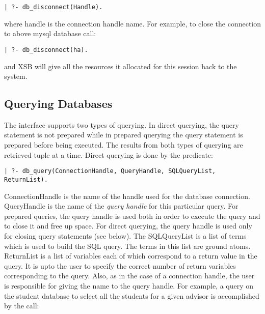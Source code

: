 \begin{verbatim}
| ?- db_disconnect(Handle).
\end{verbatim}

\noindent
where handle is the connection handle name. For example, 
to close the connection to above mysql database call:

\begin{verbatim}
| ?- db_disconnect(ha).
\end{verbatim}

and XSB will give all the resources it allocated for this session back
to the system.


\subsection{Querying Databases}

The interface supports two types of querying. In direct querying, the
query statement is not prepared while in prepared querying the query
statement is prepared before being executed. The results from
both types of querying are retrieved tuple at a time.
Direct querying is done by the predicate:

\begin{verbatim}
| ?- db_query(ConnectionHandle, QueryHandle, SQLQueryList, ReturnList).
\end{verbatim}

ConnectionHandle is the name of the handle used for the database connection.
QueryHandle is the name of the \emph{query handle} for this particular query. 
For prepared queries, the query handle is used both in order to execute the
query and to close it and free up space. For direct querying,
the query handle is used only for closing query statements (see below).
The SQLQueryList is a list of terms which is used to build the SQL query.
The terms in this list are ground atoms. ReturnList is a list of 
variables each of which correspond to a return value in the query.
It is upto the user to specify the correct number of return variables 
corresponding to the query. Also, as in the case of a connection handle, 
the user is responsible for giving the name to the query handle.
For example, a query on the student database to select all the students
for a given advisor is accomplished by the call:

